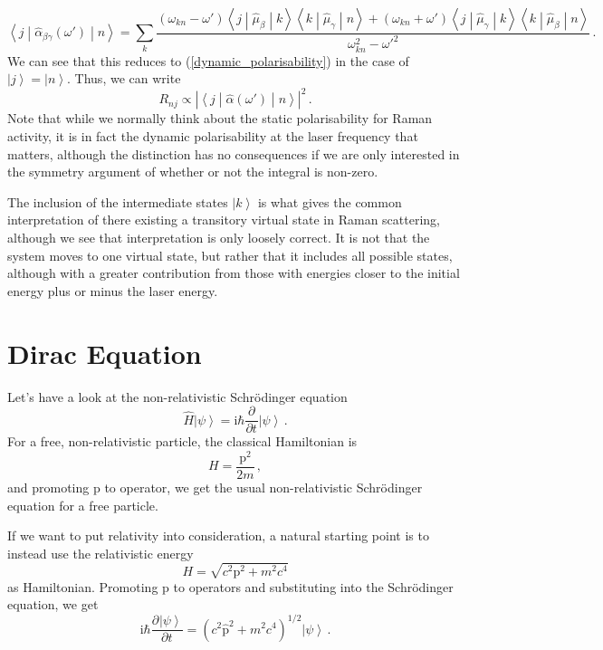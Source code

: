 \documentclass{article}
\theoremstyle{plain}\theoremheaderfont{\normalfont\itshape}\theorembodyfont{\rmfamily}\theoremseparator{.}\newtheorem*{rem}{Remark}\newtheorem*{ex}{Example}\newtheorem*{proof}{Proof}\newtheorem*{altp}{Alternative proof}
\theoremstyle{plain}\theoremheaderfont{\normalfont\bfseries}\theorembodyfont{\rmfamily}\theoremseparator{.}\newtheorem{thm}{Theorem}[section]\newtheorem{lem}[thm]{Lemma}\newtheorem{prop}[thm]{Proposition}\newtheorem*{cor}{Corollary}\newtheorem{defn}[thm]{Definition}\newtheorem{clm}[thm]{Claim}\newtheorem{clminproof}{Claim}
\theoremstyle{break}\theoremheaderfont{\normalfont\itshape}\theorembodyfont{\rmfamily}\theoremseparator{.\medskip}\newtheorem*{proofskip}{Proof}\newtheorem*{exs}{Examples}\newtheorem*{rems}{Remarks}
\theoremstyle{break}\theoremheaderfont{\normalfont\bfseries}\theorembodyfont{\rmfamily}\theoremseparator{.\medskip}\newtheorem{lemskip}[thm]{Lemma}\newtheorem{defnskip}[thm]{Definition}\newtheorem{propskip}[thm]{Proposition}\newtheorem{thmskip}[thm]{Theorem}
\numberwithin{equation}{section}
\newcommand{\ii}{\mathrm{i}}
\newcommand{\pdv}[3][]{\frac{\partial^{#1} #2}{{\partial #3}^{#1}}}
\newcommand{\ket}[1]{\left| #1 \right\rangle}
\newcommand{\mel}[3]{\left\langle #1 \middle| #2 \middle| #3 \right\rangle}
\newcommand{\vb}[1]{\bm{\mathrm{#1}}}
\newcommand{\abs}[1]{\left| #1 \right|}
\begin{document}
    \begin{equation}
        \mel{j}{\hat{\alpha}_{\beta\gamma}(\omega')}{n}=\sum_k\frac{(\omega_{kn}-\omega')\mel{j}{\hat{\mu}_\beta}{k}\mel{k}{\hat{\mu}_\gamma}{n}+(\omega_{kn}+\omega')\mel{j}{\hat{\mu}_\gamma}{k}\mel{k}{\hat{\mu}_\beta}{n}}{\omega_{kn}^2-\omega'^2}\,.
    \end{equation}
    We can see that this reduces to (\ref{dynamic_polarisability}) in the case of \(\ket{j}=\ket{n}\). Thus, we can write
    \begin{equation}
        R_{nj}\propto\abs{\mel{j}{\hat{\alpha}(\omega')}{n}}^2\,.
    \end{equation}
    Note that while we normally think about the static polarisability for Raman activity, it is in fact the dynamic polarisability at the laser frequency that matters, although the distinction has no consequences if we are only interested in the symmetry argument of whether or not the integral is non-zero.

    The inclusion of the intermediate states \(\ket{k}\) is what gives the common interpretation of there existing a transitory virtual state in Raman scattering, although we see that interpretation is only loosely correct. It is not that the system moves to one virtual state, but rather that it includes all possible states, although with a greater contribution from those with energies closer to the initial energy plus or minus the laser energy.

    \section{Dirac Equation}\label{Chap:Dirac_eqn}
    Let's have a look at the non-relativistic Schr\"{o}dinger equation
    \begin{equation}
        \hat{H}\ket{\psi}=\ii\hbar\pdv{}{t}\ket{\psi}\,.
    \end{equation}
    For a free, non-relativistic particle, the classical Hamiltonian is
    \begin{equation}
        H=\frac{\vb{p}^2}{2m}\,,
    \end{equation}
    and promoting \(\vb{p}\) to operator, we get the usual non-relativistic Schr\"{o}dinger equation for a free particle.

    If we want to put relativity into consideration, a natural starting point is to instead use the relativistic energy
    \begin{equation}\label{relativistic_energy}
        H=\sqrt{c^2\vb{p}^2+m^2 c^4}
    \end{equation}
    as Hamiltonian. Promoting \(\vb{p}\) to operators and substituting into the Schr\"{o}dinger equation, we get
    \begin{equation}
        \ii\hbar\pdv{\ket{\psi}}{t}=(c^2\hat{\vb{p}}^2+m^2 c^4)^{1/2}\ket{\psi}\,.
    \end{equation}
\end{document}
